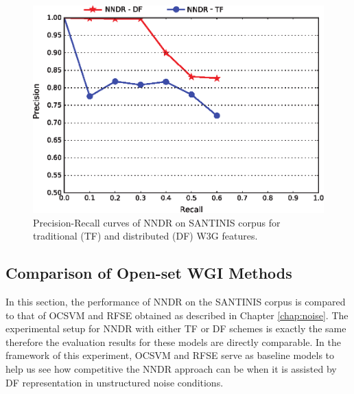 \begin{figure}[t]

\begin{center}
\includegraphics[scale=0.99]{Figures/NNDR_W3G.eps}
\caption{Precision-Recall curves of NNDR on SANTINIS corpus for traditional (TF) and distributed (DF) W3G features.}
\label{chap:word_embeddings:fig:NNDR_W3G}
\end{center}

\end{figure}

\subsection{Comparison of Open-set WGI Methods}\label{chap:word_embeddings:sec:experiments_setup}

In this section, the performance of NNDR on the SANTINIS corpus is compared to that of OCSVM and RFSE obtained as described in Chapter \ref{chap:noise}. The experimental setup for NNDR with either TF or DF schemes is exactly the same therefore the evaluation results for these models are directly comparable. In the framework of this experiment, OCSVM and RFSE serve as baseline models to help us see how competitive the NNDR approach can be when it is assisted by DF representation in unstructured noise conditions.

